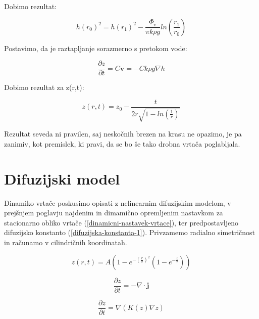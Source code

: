\documentclass[a4paper, oneside, 12pt]{book}
\begin{document}
  Dobimo rezultat:

  \begin{equation}
    h(r_0)^2 = h(r_1)^2 - \frac{\Phi_v}{\pi k \rho g} ln(\frac{r_1}{r_0})
    \label{darcy-gladina}
  \end{equation}

  Postavimo, da je raztapljanje sorazmerno s pretokom vode:

  \begin{equation}
    \frac{\partial z}{\partial t} = C \mathbf{v} = - C k \rho g \nabla h
    \label{darcy-raztapljanje-2}
  \end{equation}

  Dobimo rezultat za z(r,t):

  \begin{equation}
    z(r,t) = z_0 - \frac{t}{2 r \sqrt{1-ln\left(\frac{1}{r}\right)}}
    \label{darcy-z}
  \end{equation}

  Rezultat seveda ni pravilen, saj neskočnih brezen na krasu ne opazimo, je pa zanimiv, kot premislek, ki pravi, da se bo še tako drobna vrtača poglabljala.


  \section{Difuzijski model}

  Dinamiko vrtače poskusimo opisati z nelinearnim difuzijskim modelom, v prejšnjem poglavju najdenim in dimamično opremljenim nastavkom za stacionarno obliko vrtače (\ref{dinamicni-nastavek-vrtace}), ter  predpostavljeno difuzijsko konstanto (\ref{difuzijska-konstanta-1}). Privzamemo radialno simetričnost in računamo v cilindričnih koordinatah.

  \begin{equation}
    z(r,t) = A\left(1-e^{-\left(\frac{r}{\sigma }\right)^2}\left(1-e^{-\frac{t}{\tau }}\right)\right)
    \label{dinamicni-nastavek-vrtace}
  \end{equation}

  \begin{equation}
    \frac{\partial z}{\partial t} = - \nabla \cdot \mathbf{j}
    \label{kontinuitetna-enacba}
  \end{equation}

  \begin{equation}
    \frac{\partial z}{\partial t} = \nabla (K(z) \nabla z)
    \label{nelinearna-difuzijska-enacba}
  \end{equation}
\end{document}
